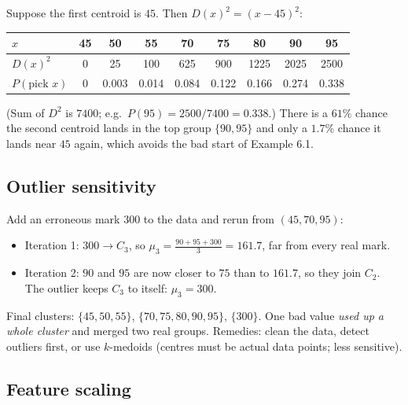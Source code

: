 \documentclass[11pt,a4paper]{article}
\begin{document}
\begin{example}
Suppose the first centroid is $45$. Then $D(x)^2=(x-45)^2$:
\begin{center}
\begin{tabular}{@{}lcccccccc@{}}
\toprule
$x$ & 45 & 50 & 55 & 70 & 75 & 80 & 90 & 95\\
\midrule
$D(x)^2$ & 0 & 25 & 100 & 625 & 900 & 1225 & 2025 & 2500\\
$P(\text{pick }x)$ & 0 & 0.003 & 0.014 & 0.084 & 0.122 & 0.166 & 0.274 & 0.338\\
\bottomrule
\end{tabular}
\end{center}
(Sum of $D^2$ is $7400$; e.g.\ $P(95)=2500/7400=0.338$.) There is a $61\%$ chance the second centroid lands in the top group $\{90,95\}$ and only a $1.7\%$ chance it lands near $45$ again, which avoids the bad start of Example 6.1.
\end{example}

\subsection{Outlier sensitivity}

\begin{example}
Add an erroneous mark $300$ to the data and rerun from $(45,70,95)$:
\begin{itemize}[nosep]
\item Iteration 1: $300\to C_3$, so $\mu_3=\frac{90+95+300}{3}=161.7$, far from every real mark.
\item Iteration 2: $90$ and $95$ are now closer to $75$ than to $161.7$, so they join $C_2$. The outlier keeps $C_3$ to itself: $\mu_3=300$.
\end{itemize}
Final clusters: $\{45,50,55\}$, $\{70,75,80,90,95\}$, $\{300\}$. One bad value \emph{used up a whole cluster} and merged two real groups. Remedies: clean the data, detect outliers first, or use $k$-medoids (centres must be actual data points; less sensitive).
\end{example}

\subsection{Feature scaling}
\end{document}
